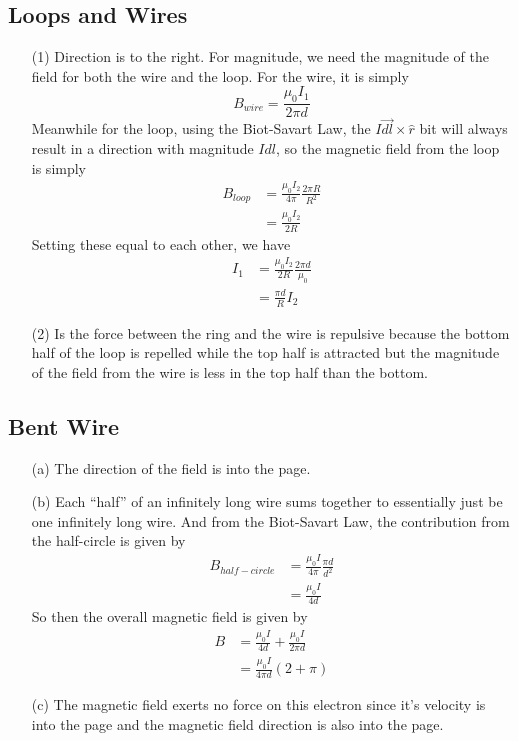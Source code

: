 \documentclass{article}
\begin{document}
\newpage

\subsection{Loops and Wires}

\begin{itemize}
\item[(1)] Direction is to the right. For magnitude, we need the magnitude of the field for both the wire and the loop. For the wire, it is simply
\begin{equation}
B_{wire} = \frac{\mu_0 I_1}{2\pi d}
\end{equation}
Meanwhile for the loop, using the Biot-Savart Law, the $I\vec{dl}\times \hat{r}$ bit will always result in a direction with magnitude $Idl$, so the magnetic field from the loop is simply
\begin{align*}
B_{loop} &= \frac{\mu_0 I_2}{4\pi}\frac{2\pi R}{R^2} \\
&= \frac{\mu_0 I_2}{2R}
\end{align*}
Setting these equal to each other, we have
\begin{align*}
I_1 &= \frac{\mu_0 I_2}{2R}\frac{2\pi d}{\mu_0} \\
&= \frac{\pi d}{R}I_2
\end{align*}
\item[(2)] Is the force between the ring and the wire is repulsive because the bottom half of the loop is repelled while the top half is attracted but the magnitude of the field from the wire is less in the top half than the bottom.
\end{itemize}

\newpage

\subsection{Bent Wire}

\begin{itemize}
\item[(a)] The direction of the field is into the page.
\item[(b)] Each ``half'' of an infinitely long wire sums together to essentially just be one infinitely long wire. And from the Biot-Savart Law, the contribution from the half-circle is given by
\begin{align*}
B_{half-circle} &= \frac{\mu_0 I}{4\pi}\frac{\pi d}{d^2} \\
&= \frac{\mu_0 I}{4d}
\end{align*}
So then the overall magnetic field is given by
\begin{align*}
B &= \frac{\mu_0 I}{4d} + \frac{\mu_0 I}{2\pi d} \\
&= \frac{\mu_0 I}{4\pi d}(2+\pi)
\end{align*}
\item[(c)] The magnetic field exerts no force on this electron since it's velocity is into the page and the magnetic field direction is also into the page.
\end{itemize}
\end{document}
